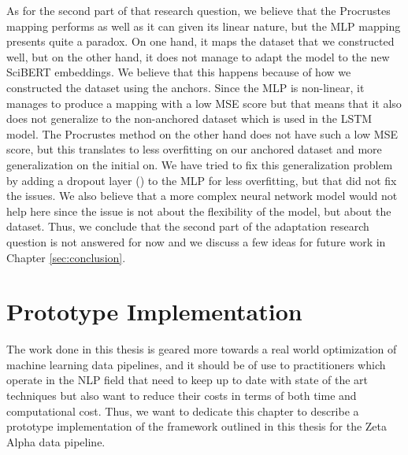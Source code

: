 \documentclass[12pt]{extreport}
\begin{document}
As for the second part of that research question, we believe that the Procrustes mapping performs as well as it can given its linear nature, but the MLP mapping presents quite a paradox. On one hand, it maps the dataset that we constructed well, but on the other hand, it does not manage to adapt the model to the new SciBERT embeddings. We believe that this happens because of how we constructed the dataset using the anchors. Since the MLP is non-linear, it manages to produce a mapping with a low MSE score but that means that it also does not generalize to the non-anchored dataset which is used in the LSTM model. The Procrustes method on the other hand does not have such a low MSE score, but this translates to less overfitting on our anchored dataset and more generalization on the initial on. We have tried to fix this generalization problem by adding a dropout layer (\cite{dropout}) to the MLP for less overfitting, but that did not fix the issues. We also believe that a more complex neural network model would not help here since the issue is not about the flexibility of the model, but about the dataset. Thus, we conclude that the second part of the adaptation research question is not answered for now and we discuss a few ideas for future work in Chapter \ref{sec:conclusion}.

\chapter{Prototype Implementation} \label{sec:prototype}

The work done in this thesis is geared more towards a real world optimization of machine learning data pipelines, and it should be of use to practitioners which operate in the NLP field that need to keep up to date with state of the art techniques but also want to reduce their costs in terms of both time and computational cost. Thus, we want to dedicate this chapter to describe a prototype implementation of the framework outlined in this thesis for the Zeta Alpha data pipeline.
\end{document}
